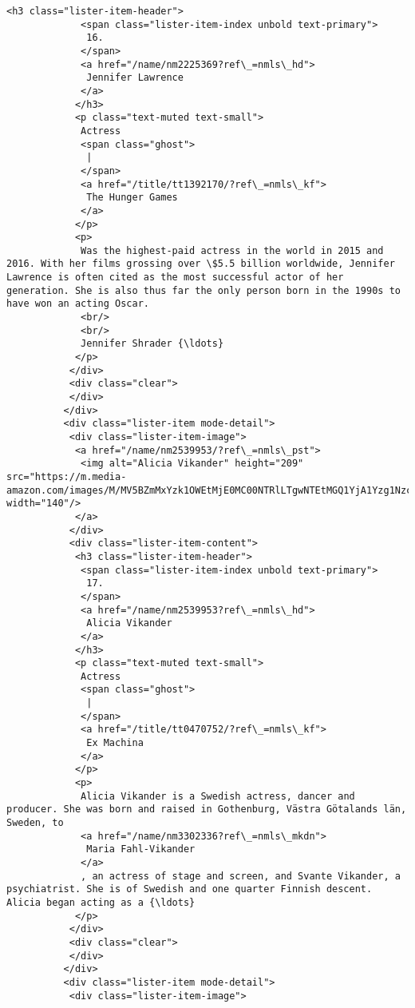 \documentclass[11pt]{article}
\begin{document}
\begin{Verbatim}[commandchars=\\\{\}]
            <h3 class="lister-item-header">
             <span class="lister-item-index unbold text-primary">
              16.
             </span>
             <a href="/name/nm2225369?ref\_=nmls\_hd">
              Jennifer Lawrence
             </a>
            </h3>
            <p class="text-muted text-small">
             Actress
             <span class="ghost">
              |
             </span>
             <a href="/title/tt1392170/?ref\_=nmls\_kf">
              The Hunger Games
             </a>
            </p>
            <p>
             Was the highest-paid actress in the world in 2015 and 2016. With her films grossing over \$5.5 billion worldwide, Jennifer Lawrence is often cited as the most successful actor of her generation. She is also thus far the only person born in the 1990s to have won an acting Oscar.
             <br/>
             <br/>
             Jennifer Shrader {\ldots}
            </p>
           </div>
           <div class="clear">
           </div>
          </div>
          <div class="lister-item mode-detail">
           <div class="lister-item-image">
            <a href="/name/nm2539953/?ref\_=nmls\_pst">
             <img alt="Alicia Vikander" height="209" src="https://m.media-amazon.com/images/M/MV5BZmMxYzk1OWEtMjE0MC00NTRlLTgwNTEtMGQ1YjA1Yzg1Nzc3XkEyXkFqcGdeQXVyMjQwMDg0Ng@@.\_V1\_UY209\_CR2,0,140,209\_AL\_.jpg" width="140"/>
            </a>
           </div>
           <div class="lister-item-content">
            <h3 class="lister-item-header">
             <span class="lister-item-index unbold text-primary">
              17.
             </span>
             <a href="/name/nm2539953?ref\_=nmls\_hd">
              Alicia Vikander
             </a>
            </h3>
            <p class="text-muted text-small">
             Actress
             <span class="ghost">
              |
             </span>
             <a href="/title/tt0470752/?ref\_=nmls\_kf">
              Ex Machina
             </a>
            </p>
            <p>
             Alicia Vikander is a Swedish actress, dancer and producer. She was born and raised in Gothenburg, Västra Götalands län, Sweden, to
             <a href="/name/nm3302336?ref\_=nmls\_mkdn">
              Maria Fahl-Vikander
             </a>
             , an actress of stage and screen, and Svante Vikander, a psychiatrist. She is of Swedish and one quarter Finnish descent. Alicia began acting as a {\ldots}
            </p>
           </div>
           <div class="clear">
           </div>
          </div>
          <div class="lister-item mode-detail">
           <div class="lister-item-image">

\end{Verbatim}
\end{document}
